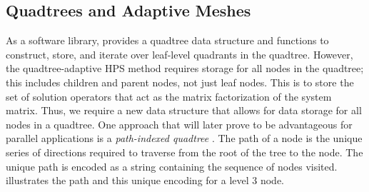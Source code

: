 \subsection{Quadtrees and Adaptive Meshes}

As a software library, \pforest provides a quadtree data structure and functions to construct, store, and iterate over leaf-level quadrants in the quadtree.  However, the quadtree-adaptive HPS method requires storage for all nodes in the quadtree; this includes children and parent nodes, not just leaf nodes. This is to store the set of solution operators that act as the matrix factorization of the system matrix. Thus, we require a new data structure that allows for data storage for all nodes in a quadtree. One approach that will later prove to be advantageous for parallel applications is a {\em path-indexed quadtree} \cite{woodward1982explicit,samet1984quadtree}. The path of a node is the unique series of directions required to traverse from the root of the tree to the node. The unique path is encoded as a string containing the sequence of nodes visited.   illustrates the path and this unique encoding for a level 3 node.

